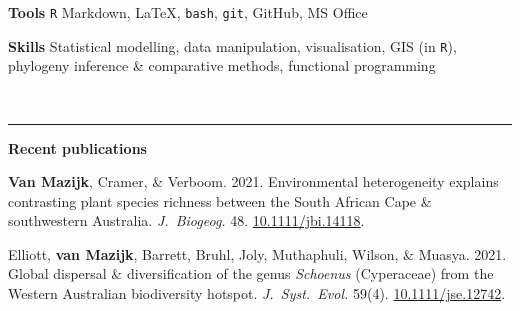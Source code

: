 \documentclass[12pt]{article}
\begin{document}
\textbf{Tools    }     \hfill                            \texttt{R} Markdown,
                                        {\selectfont \LaTeX},
                               \texttt{bash}, \texttt{git}, GitHub, MS Office

\textbf{Skills  }      \hfill Statistical modelling, data manipulation, visualisation, GIS (in \texttt{R}), \\
                       \hfill phylogeny inference \& comparative methods, functional programming

\

\hrule %

\bigskip

{\large \textbf{Recent publications}}

\bigskip

\textbf{Van Mazijk}, Cramer, \& Verboom.
2021.
Environmental heterogeneity explains contrasting plant species richness between the South African Cape \& southwestern Australia.
\textit{J.~Biogeog.} 48.
\href{https://doi.org/10.1111/jbi.14118}{10.1111/jbi.14118}.

\bigskip

Elliott, \textbf{van Mazijk}, Barrett, Bruhl, Joly, Muthaphuli, Wilson, \& Muasya.
2021.
Global dispersal \& diversification of the genus \textit{Schoenus} (Cyperaceae) from the Western Australian biodiversity hotspot.
\textit{J.~Syst.~Evol.} 59(4).
\href{https://doi.org/10.1111/jse.1274}{10.1111/jse.12742}.
\end{document}
